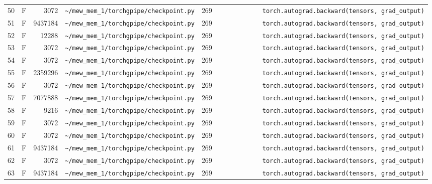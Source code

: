 \documentclass{article}
\begin{document}
\begin{longtable}{r l r p{6.5cm} r p{7.0cm}}
50 & F & 3072 & \lstinline|~/mew_mem_1/torchgpipe/checkpoint.py| & 269 & \lstinline|            torch.autograd.backward(tensors, grad_output)| \\
51 & F & 9437184 & \lstinline|~/mew_mem_1/torchgpipe/checkpoint.py| & 269 & \lstinline|            torch.autograd.backward(tensors, grad_output)| \\
52 & F & 12288 & \lstinline|~/mew_mem_1/torchgpipe/checkpoint.py| & 269 & \lstinline|            torch.autograd.backward(tensors, grad_output)| \\
53 & F & 3072 & \lstinline|~/mew_mem_1/torchgpipe/checkpoint.py| & 269 & \lstinline|            torch.autograd.backward(tensors, grad_output)| \\
54 & F & 3072 & \lstinline|~/mew_mem_1/torchgpipe/checkpoint.py| & 269 & \lstinline|            torch.autograd.backward(tensors, grad_output)| \\
55 & F & 2359296 & \lstinline|~/mew_mem_1/torchgpipe/checkpoint.py| & 269 & \lstinline|            torch.autograd.backward(tensors, grad_output)| \\
56 & F & 3072 & \lstinline|~/mew_mem_1/torchgpipe/checkpoint.py| & 269 & \lstinline|            torch.autograd.backward(tensors, grad_output)| \\
57 & F & 7077888 & \lstinline|~/mew_mem_1/torchgpipe/checkpoint.py| & 269 & \lstinline|            torch.autograd.backward(tensors, grad_output)| \\
58 & F & 9216 & \lstinline|~/mew_mem_1/torchgpipe/checkpoint.py| & 269 & \lstinline|            torch.autograd.backward(tensors, grad_output)| \\
59 & F & 3072 & \lstinline|~/mew_mem_1/torchgpipe/checkpoint.py| & 269 & \lstinline|            torch.autograd.backward(tensors, grad_output)| \\
60 & F & 3072 & \lstinline|~/mew_mem_1/torchgpipe/checkpoint.py| & 269 & \lstinline|            torch.autograd.backward(tensors, grad_output)| \\
61 & F & 9437184 & \lstinline|~/mew_mem_1/torchgpipe/checkpoint.py| & 269 & \lstinline|            torch.autograd.backward(tensors, grad_output)| \\
62 & F & 3072 & \lstinline|~/mew_mem_1/torchgpipe/checkpoint.py| & 269 & \lstinline|            torch.autograd.backward(tensors, grad_output)| \\
63 & F & 9437184 & \lstinline|~/mew_mem_1/torchgpipe/checkpoint.py| & 269 & \lstinline|            torch.autograd.backward(tensors, grad_output)| \\

\end{longtable}
\end{document}
